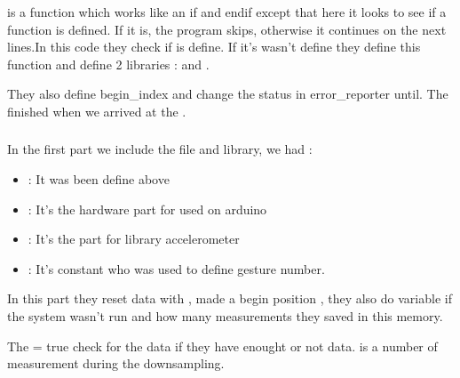  is a function which works like an if and endif except that here it looks to see if a function is defined. If it is, the program skips, otherwise it continues on the next lines.In this code they check if 
 is define. If it's wasn't define they define this function and define 2 libraries :   and  . 

They also define begin\_index and change the status in error\_reporter until. The  finished when we arrived at the .


\subsubsection{}

\begin{center}
    \label{MagicWandArduinoAccelerometerHandler}		
\end{center}

In the first part we include the file and library, we had : 
\begin{itemize}
    \item {}: It was been define above
    \item {}: It's the hardware part for used on arduino 
    \item {}: It's the part for library accelerometer 
    \item {}: It's constant who was used to define gesture number.  
\end{itemize}

In this part they reset data with , made a begin position , they also do variable if the system wasn't run and how many measurements they saved in this memory. 

The  = true check for the data if they have enought or not data.   is a number of measurement during the downsampling. 

\begin{center}
    \label{Magic Wand Arduino Starting Accelerometer}
\end{center}


